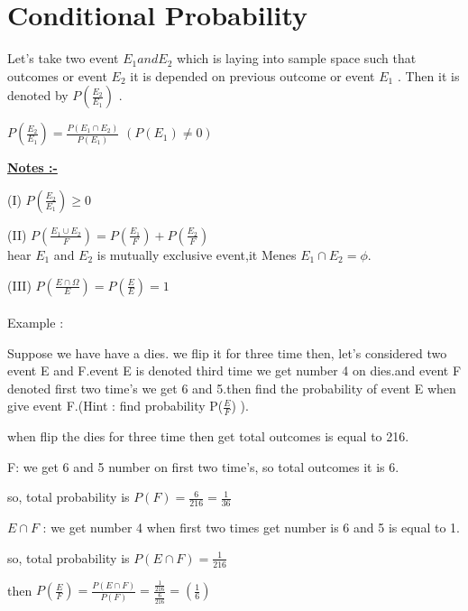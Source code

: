 \documentclass[a4paper,12pt]{article}
\theoremstyle{definition}
\begin{document}
\section{Conditional Probability}
Let's take two event $E_1  and E_2$ which is laying into sample space such that 
outcomes or event $ E_2 $ it is depended on previous outcome or event $ E_1 $ . Then it is denoted by $P(\frac{E_2}{E_1})$ .\\
\begin{center}
    $ P(\frac{E_2}{E_1}) = \frac{P(E_1\cap E_2)}{P(E_1)} $   $ (P(E_1)\neq{0}) $
\end{center}
\textbf{\underline{Notes :-}}\\
\par (I) $P(\frac{E_2}{E_1})\geq{0}$\\
\par (II) $P(\frac{E_1\cup E_2}{F}) = P(\frac{E_1}{F}) + P(\frac{E_2}{F}) $\\
\Par hear $E_1$ and $E_2$  is mutually exclusive event,it Menes $E_1 \cap E_2 = \phi $.\\
\par(III) $P(\frac{E\cap \Omega}{E}) = P(\frac{E}{E}) = 1$\\
\vskip 0.25cm\\
Example :
\par Suppose we have have a dies. we flip it for three time then, let's considered two event E and F.event E is denoted third time we get number 4 on dies.and event F denoted first two time's we get 6 and 5.then find the probability of event E when give event F.(Hint : find probability P($\frac{E}{F}$) ).
\vskip 0.5cm\\
\par when flip the dies for three time then get total outcomes is equal to 216.\\
\par F: we get 6 and 5 number on first two time's, so total outcomes it is 6.\\
\par so, total probability is $P(F)=\frac{6}{216} = \frac{1}{36}$\\
\par $E \cap F$ : we get number 4 when first two times get number is 6 and 5 is equal to 1.\\
\par so, total probability is $P(E \cap F)=\frac{1}{216}$\\
\par then  $ P(\frac{E}{F}) = \frac{P(E\cap F)}{P(F)} =\frac{\frac{1}{216}}{\frac{6}{216} } =(\frac{1}{6})$\\
\vskip 0.25cm\\
\end{document}
